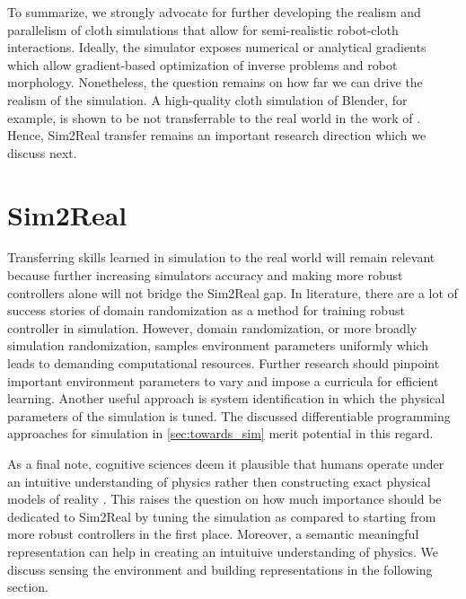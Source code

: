 \documentclass[\home/main.tex]{subfiles}
\begin{document}
To summarize, we strongly advocate for further developing the realism and parallelism of cloth simulations that allow for semi-realistic robot-cloth interactions. Ideally, the simulator exposes numerical or analytical gradients which allow gradient-based optimization of inverse problems and robot morphology. Nonetheless, the question remains on how far we can drive the realism of the simulation. A high-quality cloth simulation of Blender, for example, is shown to be not transferrable to the real world in the work of \autocite{Tanaka2018}. Hence, Sim2Real transfer remains an important research direction which we discuss next. 

\section{Sim2Real}
Transferring skills learned in simulation to the real world will remain relevant because further increasing simulators accuracy and making more robust controllers alone will not bridge the Sim2Real gap. In literature, there are a lot of success stories of domain randomization as a method for training robust controller in simulation. However, domain randomization, or more broadly simulation randomization, samples environment parameters uniformly which leads to demanding computational resources. Further research should pinpoint important environment parameters to vary and impose a curricula for efficient learning. Another useful approach is system identification in which the physical parameters of the simulation is tuned. The discussed differentiable programming approaches for simulation in \cref{sec:towards_sim} merit potential in this regard. 

As a final note, cognitive sciences deem it plausible that humans operate under an intuitive understanding of physics rather then constructing exact physical models of reality \autocite{Baillargeon2011}. This raises the question on how much importance should be dedicated to Sim2Real by tuning the simulation as compared to starting from more robust controllers in the first place. Moreover, a semantic meaningful representation can help in creating an intuituive understanding of physics. We discuss sensing the environment and building representations in the following section.  
\end{document}
